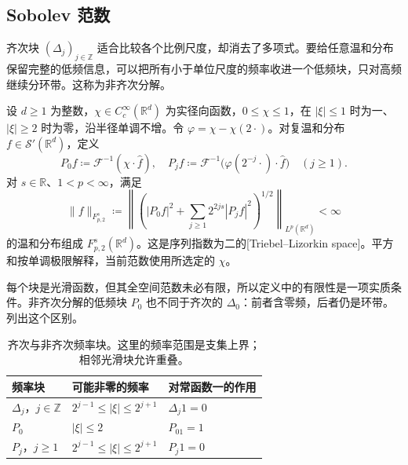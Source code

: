 \subsection{Sobolev 范数}
\label{b2:subsec:190404}

齐次块 \((\Delta_j)_{j\in\mathbb Z}\) 适合比较各个比例尺度，却消去了多项式。要给任意温和分布保留完整的低频信息，可以把所有小于单位尺度的频率收进一个低频块，只对高频继续分环带。这称为非齐次分解。

\begin{definition}[非齐次分解与平方函数空间]
\label{b2:def:19-inhomogeneous-square}
设 \(d\geq1\) 为整数，\(\chi\in C_c^\infty(\mathbb R^d)\) 为实径向函数，\(0\leq\chi\leq1\)，在 \(|\xi|\leq1\) 时为一、\(|\xi|\geq2\) 时为零，沿半径单调不增。令 \(\varphi=\chi-\chi(2\cdot)\)。对复温和分布 \(f\in\mathcal S'(\mathbb R^d)\)，定义
\[
 P_0f\coloneqq\mathcal F^{-1}(\chi\cdot\widehat f),
 \quad
 P_jf\coloneqq\mathcal F^{-1}
       \bigl(\varphi(2^{-j}\cdot)\cdot\widehat f\bigr)
 \quad(j\geq1).
\]
对 \(s\in\mathbb R\)、\(1<p<\infty\)，满足
\[
 \|f\|_{F^s_{p,2}}\coloneqq
 \left\|\left(|P_0f|^2+
       \sum_{j\geq1}2^{2js}|P_jf|^2\right)^{1/2}\right\|_{L^p(\mathbb R^d)}
 <\infty
\]
的温和分布组成 \(F^s_{p,2}(\mathbb R^d)\)。这是序列指数为二的[Triebel--Lizorkin space]。平方和按单调极限解释，当前范数使用所选定的 \(\chi\)。
\end{definition}

每个块是光滑函数，但其全空间范数未必有限，所以定义中的有限性是一项实质条件。非齐次分解的低频块 \(P_0\) 也不同于齐次的 \(\Delta_0\)：前者含零频，后者仍是环带。列出这个区别。

\begin{table}[htbp]
\centering
\caption[齐次与非齐次频率块]{齐次与非齐次频率块。这里的频率范围是支集上界；相邻光滑块允许重叠。}
\label{b2:tab:19-frequency-blocks}
\begin{tabular}{@{}lll@{}}
\toprule
频率块 & 可能非零的频率 & 对常函数一的作用 \\
\midrule
\(\Delta_j\)，\(j\in\mathbb Z\)
 & \(2^{j-1}\leq|\xi|\leq2^{j+1}\) & \(\Delta_j1=0\) \\
\(P_0\) & \(|\xi|\leq2\) & \(P_01=1\) \\
\(P_j\)，\(j\geq1\)
 & \(2^{j-1}\leq|\xi|\leq2^{j+1}\) & \(P_j1=0\) \\
\bottomrule
\end{tabular}
\end{table}

